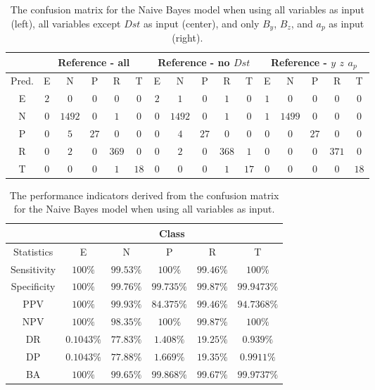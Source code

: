 \documentclass[sn-mathphys-num]{sn-jnl}%
\begin{document}
\begin{table}[!ht]
    \centering
    \caption{The confusion matrix for the Naive Bayes model when using all variables as input (left), all variables except $Dst$ as input (center), and only $B_{y}$, $B_{z}$, and $a_{p}$ as input (right).}
	\label{tab:cm:merged}
	\begin{tabular}{|c|c|c|c|c|c|c|c|c|c|c|c|c|c|c|c|}
		\hline
		 & \multicolumn{5}{|c|}{Reference - all} & \multicolumn{5}{|c|}{Reference - no $Dst$} & \multicolumn{5}{|c|}{Reference - $y$ $z$ $a_{p}$} \\ \hline
		 Pred. & E & N & P & R & T & E & N & P & R & T & E & N & P & R & T \\ \hline
		 E & $2$ & $0$ & $0$ & $0$ & $0$ & $2$ & $1$ & $0$ & $1$ & $0$ & $1$ & $0$ & $0$ & $0$ & $0$ \\ \hline
		 N & $0$ & $1492$ & $0$ & $1$ & $0$ & $0$ & $1492$ & $0$ & $1$ & $0$ & $1$ & $1499$ & $0$ & $0$ & $0$ \\ \hline
		 P & $0$ & $5$ & $27$ & $0$ & $0$ & $0$ & $4$ & $27$ & $0$ & $0$ & $0$ & $0$ & $27$ & $0$ & $0$ \\ \hline
		 R & $0$ & $2$ & $0$ & $369$ & $0$ & $0$ & $2$ & $0$ & $368$ & $1$ & $0$ & $0$ & $0$ & $371$ & $0$ \\ \hline
		 T & $0$ & $0$ & $0$ & $1$ & $18$ & $0$ & $0$ & $0$ & $1$ & $17$ & $0$ & $0$ & $0$ & $0$ & $18$ \\ \hline
	\end{tabular}
\end{table}

\begin{table}[!ht]
    \centering
    \caption{The performance indicators derived from the confusion matrix for the Naive Bayes model when using all variables as input.}
	\label{tab:cs:reverse:all:nb}
	\begin{tabular}{|c|c|c|c|c|c|}
		\hline
		 & \multicolumn{5}{c|}{Class} \\ \hline
		Statistics & E & N & P & R & T \\ \hline
		Sensitivity & $100\%$ & $99.53\%$ & $100\%$ & $99.46\%$ & $100\%$ \\ \hline
		Specificity & $100\%$ & $99.76\%$ & $99.735\%$ & $99.87\%$ & $99.9473\%$ \\ \hline
		PPV & $100\%$ & $99.93\%$ & $84.375\%$ & $99.46\%$ & $94.7368\%$ \\ \hline
		NPV & $100\%$ & $98.35\%$ & $100\%$ & $99.87\%$ & $100\%$ \\ \hline
		DR & $0.1043\%$ & $77.83\%$ & $1.408\%$ & $19.25\%$ & $0.939\%$ \\ \hline
		DP & $0.1043\%$ & $77.88\%$ & $1.669\%$ & $19.35\%$ & $0.9911\%$ \\ \hline
		BA & $100\%$ & $99.65\%$ & $99.868\%$ & $99.67\%$ & $99.9737\%$ \\ \hline
	\end{tabular}
\end{table}
\end{document}
